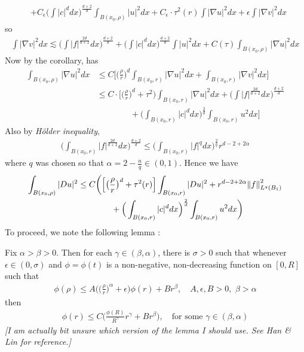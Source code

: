 \documentclass[12pt,a4paper]{article}
\newenvironment{proof}
{\begin{changemargin}{0.5cm}{0.5cm} 
	}%
	{\end{changemargin}
}
\newenvironment{subproof}
{\begin{changemargin}{0.5cm}{0.5cm} 
	}%
	{\end{changemargin}
}
\newenvironment{p}
{\begin{proof} 
	}%
	{\end{proof}
}
\begin{document}
\begin{p}
\begin{align*}
& + C_{\epsilon} \Big( \int |c|^d dx \Big)^{\frac{d+2}{d}} \int_{B(x_0, \rho)} |u|^2 dx + C_{\epsilon}\cdot \tau^2(r) \int |\nabla u|^2 dx + \epsilon \int |\nabla v|^2 dx 
\end{align*}
so
\begin{align*}
\int |\nabla v|^2 dx \lesssim \Big( \int |f|^{\frac{2d}{d+2}} dx\Big)^{\frac{d+2}{d}} + \Big( \int |c|^d dx \Big)^{\frac{d+2}{d}} \int |u|^2 dx + C(\tau)\int_{B(x_0, \rho)} |\nabla u|^2 dx 
\end{align*}
Now by the corollary, has 
\begin{align*}
\int_{B(x_0, \rho)} |\nabla u|^2 dx &\leq C \Big[ \Big( \frac{\rho}{r} \Big)^d \int_{B(x_0, r)} |\nabla u|^2 dx + \int_{B(x_0, r)} |\nabla v|^2 dx \Big] \\
& \leq C \cdot \Big[ \Big( \frac{\rho}{r} \Big)^d + \tau^2 \Big) \int_{B(x_0, r)} |\nabla u|^2 dx + \Big( \int |f|^{\frac{2d}{d+2}} dx\Big)^{\frac{d+2}{d}} \\
& \quad \quad\quad\quad + \Big( \int_{B(x_0, r)} |c|^d dx \Big)^{\frac{2}{d}} \int_{B(x_0, r)} u^2 dx \Big]
\end{align*}
Also by \emph{H\"older inequality},
\begin{align*}
\Big( \int_{B(x_0, r)} |f|^{\frac{2d}{d+2}} dx\Big)^{\frac{d+2}{d}} \leq \Big( \int_{B(x_0, r)} |f|^{q}dx \Big)^{\frac{2}{q}} r^{d-2 + 2\alpha}
\end{align*}
where $q$ was chosen so that $\alpha = 2- \frac{n}{q} \in (0,1)$. Hence we have
\begin{align*}
\int_{B(x_0, \rho)} |Du|^2 & \leq C \bigg( \Big[ \big(\frac{\rho}{r} \big)^d + \tau^2(r) \Big] \int_{B(x_0,r)} |Du|^2 + r^{d-2+2\alpha} \snorms{f}{L^q(B_1)}^2 \\
& \quad\quad\quad\quad + \Big( \int_{B(x_0, r)} |c|^d dx\Big)^{\frac{2}{d}}\int_{B(x_0, r)} u^2 dx \bigg)
\end{align*}
To proceed, we note the following lemma :
\begin{subproof}
\lem Fix $\alpha > \beta >0$. Then for each $\gamma \in (\beta, \alpha)$, there is $\sigma >0$ such that whenever $\epsilon \in (0, \sigma)$ and $\phi =\phi(t)$ is a non-negative, non-decreasing function on $[0, R]$ such that
\begin{align*}
\phi(\rho) \leq A \Big( \big( \frac{\rho}{r}\big)^{\alpha} + \epsilon \Big) \phi(r) + Br^{\beta}, \quad A, \epsilon, B>0, \,\, \beta >\alpha
\end{align*}
then
\begin{align*}
\phi(r) \leq C \Big( \frac{\phi(R)}{R^{\gamma}}r^{\gamma} + Br^{\beta} \Big), \quad \text{for some } \gamma \in (\beta , \alpha)
\end{align*}
\emph{[I am actually bit unsure which version of the lemma I should use. See Han \& Lin for reference.]}


\end{subproof}
\end{p}
\end{document}
